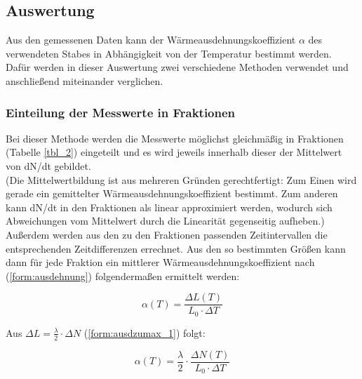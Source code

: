 \subsection{Auswertung}
Aus den gemessenen Daten kann der Wärmeausdehnungskoeffizient $ \alpha $ des verwendeten Stabes in Abhängigkeit von der Temperatur bestimmt werden. Dafür werden in dieser Auswertung zwei verschiedene Methoden verwendet und anschließend miteinander verglichen.

\subsubsection{Einteilung der Messwerte in Fraktionen}
Bei dieser Methode werden die Messwerte möglichst gleichmäßig in Fraktionen (Tabelle \ref{tbl_2}) eingeteilt und es wird jeweils innerhalb dieser der Mittelwert von dN/dt gebildet.\\(Die Mittelwertbildung ist aus mehreren Gründen gerechtfertigt: Zum Einen wird gerade ein gemittelter Wärmeausdehnungskoeffizient bestimmt. Zum anderen kann dN/dt in den Fraktionen als linear approximiert werden, wodurch sich Abweichungen vom Mittelwert durch die Linearität gegenseitig aufheben.) Außerdem werden aus den zu den Fraktionen passenden Zeitintervallen die entsprechenden Zeitdifferenzen errechnet. Aus den so bestimmten Größen kann dann für jede Fraktion ein mittlerer Wärmeausdehnungskoeffizient nach (\ref{form:ausdehnung}) folgendermaßen ermittelt werden:

\begin{equation}
\alpha(T)=\frac{\Delta L(T)}{L_{0} \cdot \Delta T}
\end{equation}

Aus $ \Delta L = \frac{\lambda}{2} \cdot \Delta N $ (\ref{form:ausdzumax_1}) folgt:

\begin{equation}
\alpha (T)= \frac{\lambda}{2} \cdot \frac{\Delta N(T)}{L_0 \cdot \Delta T}
\end{equation}

